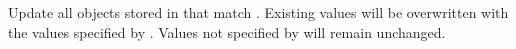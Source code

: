 Update all objects stored in  that match .  Existing
values will be overwritten with the values specified by .  Values not
specified by  will remain unchanged.


